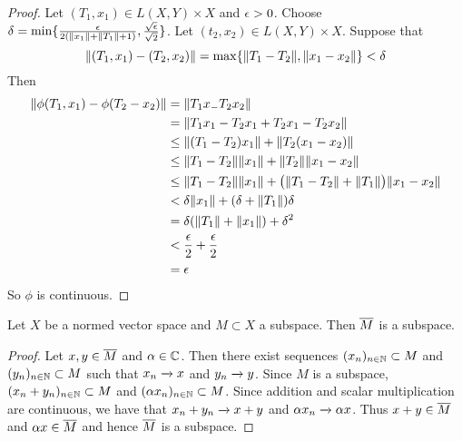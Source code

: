 \documentclass{book}
\begin{document}
	\begin{proof}
		Let $(T_1, x_1) \in L(X,Y) \times X$ and $\epsilon > 0$. Choose $\delta = \min \{\frac{\epsilon}{2(\|x_1 \|+ \|T_1 \|+1)}, \frac{\sqrt{\epsilon}}{\sqrt{2}} \}$. Let $(t_2, x_2) \in L(X,Y) \times X$. Suppose that $$\|(T_1, x_1) - (T_2, x_2) \|= \max \{\|T_1 - T_2\|, \|x_1 -x_2 \|\} < \delta$$ Then 
		\begin{align*}
			\|\phi(T_1, x_1) - \phi(T_2-x_2) \|
			&= \|T_1 x_ - T_2 x_2 \|\\
			&= \|T_1 x_1 - T_2 x_1 + T_2 x_1 - T_2 x_2 \|\\
			& \leq \|(T_1 - T_2) x_1 \|+ \|T_2(x_1 -x_2) \|\\
			& \leq \|T_1 -T_2 \|\|x_1 \|+ \|T_2 \|\|x_1 -x_2 \|\\
			& \leq \|T_1 -T_2 \|\|x_1 \|+ \big(\|T_1 - T_2 \|+ \|T_1 \|\big)\|x_1 -x_2 \|\\
			& < \delta \|x_1 \|+ (\delta + \|T_1 \|) \delta \\
			&= \delta (\|T_1 \|+ \|x_1 \|) + \delta^2\\
			& < \frac{\epsilon}{2} + \frac{\epsilon}{2}\\
			&= \epsilon
		\end{align*}
		So $\phi$ is continuous.
	\end{proof}
	
	\begin{ex} \lex{}
		Let $X$ be a normed vector space and $M \subset X$ a subspace. Then $\overline{M}$ is a subspace.
	\end{ex}
	
	\begin{proof}
		Let $x,y \in \overline{M}$ and $\alpha \in \mathbb{C}$. Then there exist sequences $(x_n)_{n \in \mathbb{N}} \subset M$ and $(y_n)_{n \in \mathbb{N}} \subset M$ such that $x_n \xrightarrow{} x$ and $y_n \xrightarrow{} y$. Since $M$ is a subspace, $(x_n +y_n)_{n \in \mathbb{N}} \subset M$ and $(\alpha x_n)_{n \in \mathbb{N}} \subset M$. Since addition and scalar multiplication are continuous, we have that $x_n + y_n \xrightarrow{} x+y$ and $\alpha x_n \xrightarrow{} \alpha x$. Thus $x+y \in \overline{M}$ and $\alpha x \in \overline{M}$ and hence $\overline{M}$ is a subspace.
	\end{proof}
	
	\newpage
	
	
	
	
	
	
	
	



	
	
	
	
	
	
\end{document}
